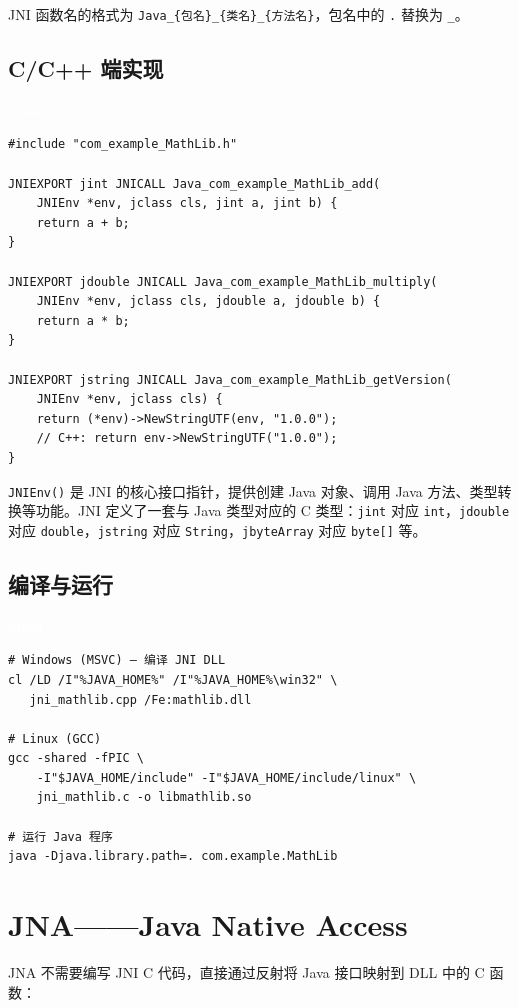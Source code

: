 \documentclass[12pt,a4paper,fontset=fandol]{ctexbook}
\newcommand{\cpplabel}{%
  \begin{tcolorbox}[enhanced,colback=cppheadbg,colframe=cppheadbg,
    arc=1mm,boxrule=0mm,left=6pt,right=6pt,top=2pt,bottom=2pt,
    halign=left,oversize]
    \textcolor{white}{\small\bfseries C++}
  \end{tcolorbox}\vspace{-4pt}}
\newcommand{\bashlabel}{%
  \begin{tcolorbox}[enhanced,colback=black!80,colframe=black!80,
    arc=1mm,boxrule=0mm,left=6pt,right=6pt,top=2pt,bottom=2pt,
    halign=left,oversize]
    \textcolor{white}{\small\bfseries Shell}
  \end{tcolorbox}\vspace{-4pt}}
\newcommand{\Fn}[1]{\texttt{#1()}}
\newcommand{\Tp}[1]{\texttt{#1}}
\begin{document}
JNI 函数名的格式为 \texttt{Java\_\{包名\}\_\{类名\}\_\{方法名\}}，包名中的 \texttt{.} 替换为 \texttt{\_}。

\subsection{C/C++ 端实现}
\cpplabel
\begin{lstlisting}[style=cppstyle]
#include "com_example_MathLib.h"

JNIEXPORT jint JNICALL Java_com_example_MathLib_add(
    JNIEnv *env, jclass cls, jint a, jint b) {
    return a + b;
}

JNIEXPORT jdouble JNICALL Java_com_example_MathLib_multiply(
    JNIEnv *env, jclass cls, jdouble a, jdouble b) {
    return a * b;
}

JNIEXPORT jstring JNICALL Java_com_example_MathLib_getVersion(
    JNIEnv *env, jclass cls) {
    return (*env)->NewStringUTF(env, "1.0.0");
    // C++: return env->NewStringUTF("1.0.0");
}
\end{lstlisting}

\begin{tcolorbox}[note={JNIEnv 与类型映射}]
\Fn{JNIEnv} 是 JNI 的核心接口指针，提供创建 Java 对象、调用 Java 方法、类型转换等功能。JNI 定义了一套与 Java 类型对应的 C 类型：\Tp{jint} 对应 \Tp{int}，\Tp{jdouble} 对应 \Tp{double}，\Tp{jstring} 对应 \Tp{String}，\Tp{jbyteArray} 对应 \Tp{byte[]} 等。
\end{tcolorbox}

\subsection{编译与运行}

\bashlabel
\begin{lstlisting}[style=bashstyle]
# Windows (MSVC) — 编译 JNI DLL
cl /LD /I"%JAVA_HOME%" /I"%JAVA_HOME%\win32" \
   jni_mathlib.cpp /Fe:mathlib.dll

# Linux (GCC)
gcc -shared -fPIC \
    -I"$JAVA_HOME/include" -I"$JAVA_HOME/include/linux" \
    jni_mathlib.c -o libmathlib.so

# 运行 Java 程序
java -Djava.library.path=. com.example.MathLib
\end{lstlisting}

\section{JNA——Java Native Access}

JNA 不需要编写 JNI C 代码，直接通过反射将 Java 接口映射到 DLL 中的 C 函数：
\end{document}

